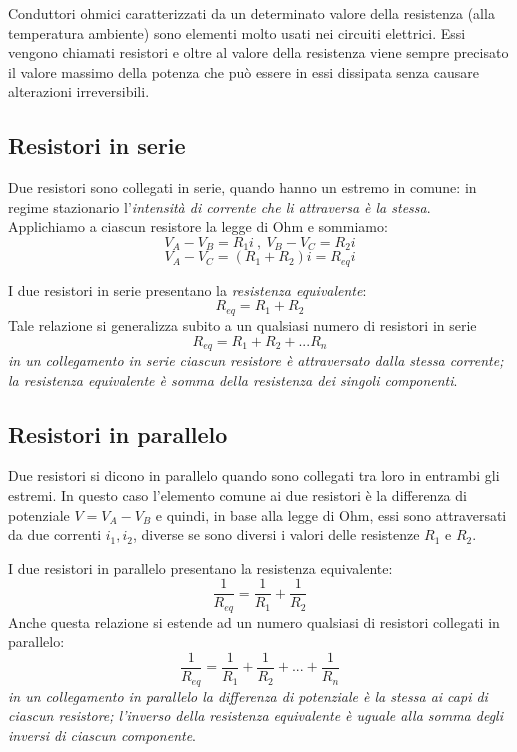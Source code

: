 \documentclass[class=book, crop=false, oneside, 12pt]{standalone}
\begin{document}
Conduttori ohmici caratterizzati da un determinato valore della resistenza (alla temperatura ambiente) sono elementi molto usati nei circuiti elettrici. 
Essi vengono chiamati resistori e oltre al valore della resistenza viene sempre precisato il valore massimo della potenza che può essere in essi dissipata senza causare alterazioni irreversibili.

\subsection{Resistori in serie}

Due resistori sono collegati in serie, quando hanno un estremo in comune: in regime stazionario l'\emph{intensità di corrente che li attraversa è la stessa}. 
Applichiamo a ciascun resistore la legge di Ohm e sommiamo:
\begin{equation*}
    V_A - V_B = R_1 i \ , \ V_B - V_C = R_2 i 
\end{equation*}
\begin{equation*}
    V_A - V_C = \left(R_1 + R_2 \right) i = R_{eq} i
\end{equation*}

I due resistori in serie presentano la \emph{resistenza equivalente}:
\begin{equation*}
    R_{eq} = R_1 + R_2
\end{equation*}
Tale relazione si generalizza subito a un qualsiasi numero di resistori in serie
\begin{equation}
    R_{eq} = R_1 + R_2 + ... R_n
\end{equation}
\emph{in un collegamento in serie ciascun resistore è attraversato dalla stessa corrente; la resistenza equivalente è somma della resistenza dei singoli componenti}.

\subsection{Resistori in parallelo}

Due resistori si dicono in parallelo quando sono collegati tra loro in entrambi gli estremi. 
In questo caso l'elemento comune ai due resistori è la differenza di potenziale \(V = V_A -V_B\) e quindi, in base alla legge di Ohm, essi sono attraversati da due correnti \(i_1, i_2\), diverse se sono diversi i valori delle resistenze \(R_1\) e \(R_2\).

I due resistori in parallelo presentano la resistenza equivalente: 
\begin{equation*}
    \frac{1}{R_{eq}} = \frac{1}{R_1} + \frac{1}{R_2}
\end{equation*}
Anche questa relazione si estende ad un numero qualsiasi di resistori collegati in parallelo: 
\begin{equation}
    \frac{1}{R_{eq}} = \frac{1}{R_1} + \frac{1}{R_2} + ... + \frac{1}{R_n}
\end{equation}
\emph{in un collegamento in parallelo la differenza di potenziale è la stessa ai capi di ciascun resistore; l'inverso della resistenza equivalente è uguale alla somma degli inversi di ciascun componente}.
\end{document}
